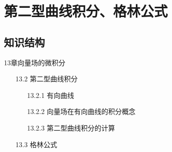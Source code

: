 \documentclass[12pt,UTF8]{ctexart}
\begin{document}
\setcounter{section}{21}
\section{第二型曲线积分、格林公式}
\subsection{知识结构}
13章向量场的微积分
	\begin{enumerate}
		\item[13.2]第二型曲线积分
			\begin{enumerate}
				\item[13.2.1]有向曲线
				\item[13.2.2]向量场在有向曲线的积分概念
				\item[13.2.3]第二型曲线积分的计算
			\end{enumerate}
		\item[13.3]格林公式
	\end{enumerate}
\end{document}
